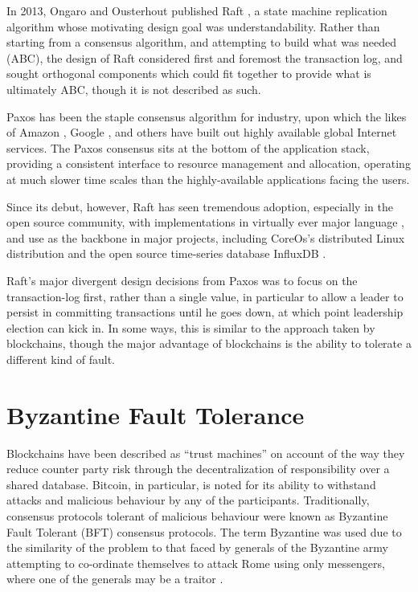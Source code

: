 In 2013, Ongaro and Ousterhout published Raft \cite{raft},
a state machine replication algorithm whose motivating design goal was understandability.
Rather than starting from a consensus algorithm, and attempting to build what was needed (ABC),
the design of Raft considered first and foremost the transaction log,
and sought orthogonal components which could fit together to provide what is ultimately ABC,
though it is not described as such.

Paxos has been the staple consensus algorithm for industry, 
upon which the likes of Amazon \cite{dynamo}, Google \cite{chubby}, 
and others have built out highly available global Internet services.
The Paxos consensus sits at the bottom of the application stack, 
providing a consistent interface to resource management and allocation, 
operating at much slower time scales than the highly-available applications facing the users.

Since its debut, however, Raft has seen tremendous adoption, especially in the open source community,
with implementations in virtually ever major language \cite{raft.github.io},
and use as the backbone in major projects, 
including CoreOs's distributed Linux distribution \cite{coreos_raft} 
and the open source time-series database InfluxDB \cite{influxdb,hashicorp_raft}.

Raft's major divergent design decisions from Paxos was to 
focus on the transaction-log first, rather than a single value,
in particular to allow a leader to persist in committing transactions until he goes down, 
at which point leadership election can kick in. 
In some ways, this is similar to the approach taken by blockchains, 
though the major advantage of blockchains is the ability to tolerate a different kind of fault.

\section{Byzantine Fault Tolerance}

Blockchains have been described as ``trust machines'' \cite{economist_blockchains} on account of the way they reduce counter party risk through the decentralization of responsibility over a shared database.
Bitcoin, in particular, is noted for its ability to withstand attacks and malicious behaviour by any of the participants. 
Traditionally, consensus protocols tolerant of malicious behaviour were known as Byzantine Fault Tolerant (BFT) consensus protocols.
The term Byzantine was used due to the similarity of the problem to that faced by generals of the Byzantine army attempting to co-ordinate themselves to attack Rome using only messengers,
where one of the generals may be a traitor \cite{lamport1982byzantine}.

